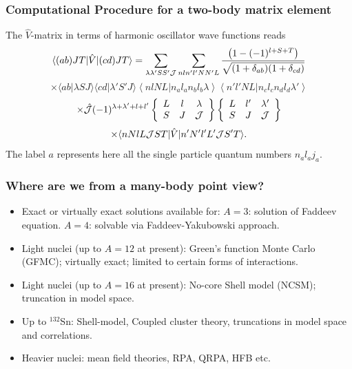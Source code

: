 \documentclass[compress]{beamer}
\newcommand*{\ket}[1]{|#1\rangle}
\newcommand*{\bra}[1]{\langle#1|}
\begin{document}
\frame
{
\frametitle{Computational Procedure for a two-body matrix element}
\begin{small}
{\scriptsize
The $\hat{V}$-matrix in terms of harmonic oscillator wave functions reads
\[
  \bra{(ab)JT}\hat{V}\ket{(cd)JT}=
  {\displaystyle \sum_{\lambda \lambda ' SS' {\cal J}}\sum_{nln'l'NN'L}
  \frac{\left(1-(-1)^{l+S+T}\right)}{\sqrt{(1+\delta_{ab})
  (1+\delta_{cd})}}}
\]
\[
  \times\langle ab|\lambda SJ\rangle \langle cd|\lambda 'S'J\rangle
  \left\langle nlNL| n_{a}l_{a}n_{b}l_{b}\lambda\right\rangle
  \left\langle n'l'NL| n_{c}l_{c}n_{d}l_{d}\lambda ' \right\rangle
\]
\[
 \times \hat{{\cal J}}(-1)^{\lambda + \lambda ' +l +l'}
  \left\{\begin{array}{ccc}L&l&\lambda\\S&J&{\cal J}
  \end{array}\right\}
  \left\{\begin{array}{ccc}L&l'&\lambda '\\S&J&{\cal J}
  \end{array}\right\}
\]
\[
 \times\bra{nNlL{\cal J}ST}\hat{V}\ket{n'N'l'L'{\cal J}S'T}.
\]
The label $a$ represents here all the single particle quantum numbers  
$n_{a}l_{a}j_{a}$.
}
\end{small}
}



\frame
{
\frametitle{Where are we from a many-body point view?}
\begin{itemize}
\item Exact or virtually exact solutions available for:
$A=3$: solution of Faddeev equation.
$A=4$: solvable via Faddeev-Yakubowski approach.
\item 
Light nuclei (up to $A=12$ at present): Green's function Monte Carlo (GFMC);
virtually exact; limited to certain forms of interactions.
\item
Light nuclei (up to $A=16$ at present): No-core Shell model (NCSM); truncation
in model space.
\item
Up to $^{132}$Sn: Shell-model, Coupled cluster theory, truncations in model space and correlations.
\item Heavier nuclei: mean field theories, RPA, QRPA, HFB etc.
\end{itemize}
}
\end{document}
